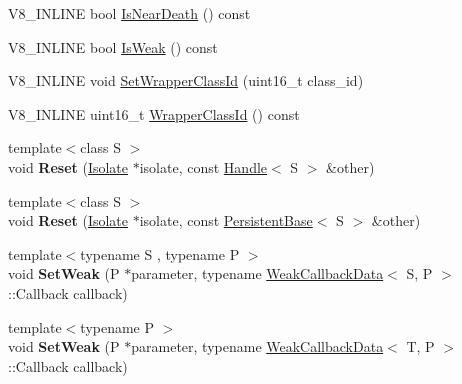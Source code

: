 \begin{DoxyCompactItemize}
\item 
V8\+\_\+\+I\+N\+L\+I\+N\+E bool \hyperlink{classv8_1_1_persistent_base_a4a64c26d91ed6a276aa8a7ca4bb7683a}{Is\+Near\+Death} () const 
\item 
V8\+\_\+\+I\+N\+L\+I\+N\+E bool \hyperlink{classv8_1_1_persistent_base_a714b7794149df483837a2c6b09d52396}{Is\+Weak} () const 
\item 
V8\+\_\+\+I\+N\+L\+I\+N\+E void \hyperlink{classv8_1_1_persistent_base_ac4c979164b3ed4dc92319e6f5a108d3d}{Set\+Wrapper\+Class\+Id} (uint16\+\_\+t class\+\_\+id)
\item 
V8\+\_\+\+I\+N\+L\+I\+N\+E uint16\+\_\+t \hyperlink{classv8_1_1_persistent_base_a01a46bf4e69ed9a837639702ee234643}{Wrapper\+Class\+Id} () const 
\item 
\hypertarget{classv8_1_1_persistent_base_a1d3ad48623c429889afb03b557c926e0}{}{\footnotesize template$<$class S $>$ }\\void {\bfseries Reset} (\hyperlink{classv8_1_1_isolate}{Isolate} $\ast$isolate, const \hyperlink{classv8_1_1_handle}{Handle}$<$ S $>$ \&other)\label{classv8_1_1_persistent_base_a1d3ad48623c429889afb03b557c926e0}

\item 
\hypertarget{classv8_1_1_persistent_base_a67cbcedf77d176d3870fa4993e300b61}{}{\footnotesize template$<$class S $>$ }\\void {\bfseries Reset} (\hyperlink{classv8_1_1_isolate}{Isolate} $\ast$isolate, const \hyperlink{classv8_1_1_persistent_base}{Persistent\+Base}$<$ S $>$ \&other)\label{classv8_1_1_persistent_base_a67cbcedf77d176d3870fa4993e300b61}

\item 
\hypertarget{classv8_1_1_persistent_base_a26cacb456e6a02bb8214dfd8a31247c9}{}{\footnotesize template$<$typename S , typename P $>$ }\\void {\bfseries Set\+Weak} (P $\ast$parameter, typename \hyperlink{classv8_1_1_weak_callback_data}{Weak\+Callback\+Data}$<$ S, P $>$\+::Callback callback)\label{classv8_1_1_persistent_base_a26cacb456e6a02bb8214dfd8a31247c9}

\item 
\hypertarget{classv8_1_1_persistent_base_aaf342ece1a4ba926ba62e8d6af7be777}{}{\footnotesize template$<$typename P $>$ }\\void {\bfseries Set\+Weak} (P $\ast$parameter, typename \hyperlink{classv8_1_1_weak_callback_data}{Weak\+Callback\+Data}$<$ T, P $>$\+::Callback callback)\label{classv8_1_1_persistent_base_aaf342ece1a4ba926ba62e8d6af7be777}

\end{DoxyCompactItemize}
